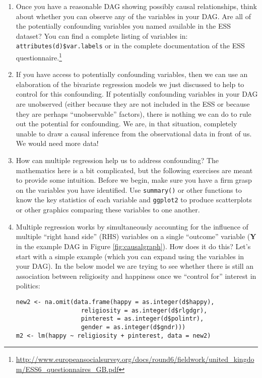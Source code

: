 \documentclass[a4paper,12pt]{article}
\begin{document}
\begin{enumerate}
\item Once you have a reasonable DAG showing possibly causal relationships, think about whether you can observe any of the variables in your DAG. Are all of the potentially confounding variables you named available in the ESS dataset? You can find a complete listing of variables in: \texttt{attributes(d)\$var.labels} or in the complete documentation of the ESS questionnaire.\footnote{\url{http://www.europeansocialsurvey.org/docs/round6/fieldwork/united_kingdom/ESS6_questionnaires_GB.pdf}}

\item If you have access to potentially confounding variables, then we can use an elaboration of the bivariate regression models we just discussed to help to control for this confounding. If potentially confounding variables in your DAG are unobserved (either because they are not included in the ESS or because they are perhaps ``unobservable'' factors), there is nothing we can do to rule out the potential for confounding. We are, in that situation, completely unable to draw a causal inference from the observational data in front of us. We would need more data!

\item How can multiple regression help us to address confounding? The mathematics here is a bit complicated, but the following exercises are meant to provide some intuition. Before we begin, make sure you have a firm grasp on the variables you have identified. Use \texttt{summary()} or other functions to know the key statistics of each variable and \texttt{ggplot2} to produce scatterplots or other graphics comparing these variables to one another.

\item Multiple regression works by simultaneously accounting for the influence of multiple ``right hand side'' (RHS) variables on a single ``outcome'' variable (\textbf{Y} in the example DAG in Figure \ref{fig:causalgraph}). How does it do this? Let's start with a simple example (which you can expand using the variables in your DAG). In the below model we are trying to see whether there is still an association between religiosity and happiness once we ``control for'' interest in politics:

\begin{verbatim}
new2 <- na.omit(data.frame(happy = as.integer(d$happy),
                  religiosity = as.integer(d$rlgdgr),
                  pinterest = as.integer(d$polintr),
                  gender = as.integer(d$gndr)))
m2 <- lm(happy ~ religiosity + pinterest, data = new2)
\end{verbatim}


\end{enumerate}
\end{document}
